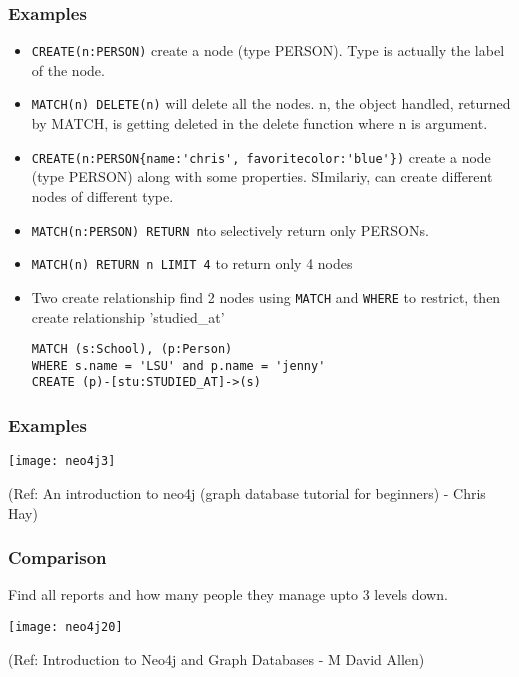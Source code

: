 \begin{frame}[fragile]\frametitle{Examples}

\begin{itemize}
\item \lstinline|CREATE(n:PERSON)| create a node (type PERSON). Type is actually the label of the node.
\item \lstinline|MATCH(n) DELETE(n)| will delete all the nodes. n, the object handled, returned by MATCH, is getting deleted in the delete function where n is argument. 
\item \lstinline|CREATE(n:PERSON{name:'chris', favoritecolor:'blue'})| create a node (type PERSON) along with some properties. SImilariy, can create different nodes of different type.
\item \lstinline|MATCH(n:PERSON) RETURN n|to selectively return only PERSONs.
\item \lstinline|MATCH(n) RETURN n LIMIT 4| to return only 4 nodes
\item Two create relationship find 2 nodes using \lstinline|MATCH| and \lstinline|WHERE| to restrict, then create relationship 'studied\_at'

\begin{lstlisting}
MATCH (s:School), (p:Person)
WHERE s.name = 'LSU' and p.name = 'jenny'
CREATE (p)-[stu:STUDIED_AT]->(s)
\end{lstlisting}


\end{itemize}

\end{frame}


\begin{frame}[fragile]\frametitle{Examples}


\begin{center}
\texttt{[image: neo4j3]}
\end{center}	

{\tiny (Ref: An introduction to neo4j (graph database tutorial for beginners) - Chris Hay)}

\end{frame}

\begin{frame}[fragile]\frametitle{Comparison}
Find all reports and how many people they manage upto 3 levels down.

\begin{center}
\texttt{[image: neo4j20]}
\end{center}	    

{\tiny (Ref: Introduction to Neo4j and Graph Databases
 - M David Allen)}

\end{frame}

